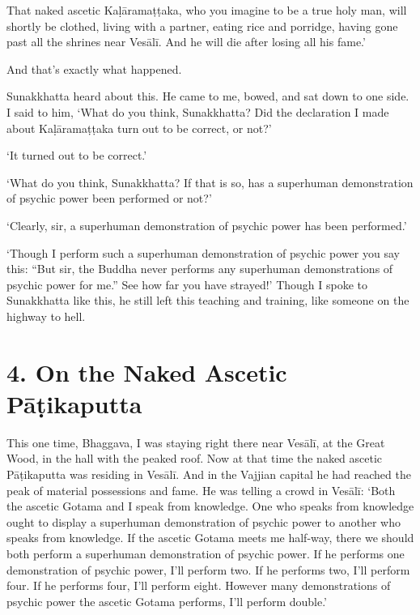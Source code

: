 \documentclass[12pt,openany]{book}%
\begin{document}
That naked ascetic \textsanskrit{Kaḷāramaṭṭaka}, who you imagine to be a true holy man, will shortly be clothed, living with a partner, eating rice and porridge, having gone past all the shrines near \textsanskrit{Vesālī}. And he will die after losing all his fame.’ 

And that’s exactly what happened. 

Sunakkhatta heard about this. He came to me, bowed, and sat down to one side. I said to him, ‘What do you think, Sunakkhatta? Did the declaration I made about \textsanskrit{Kaḷāramaṭṭaka} turn out to be correct, or not?’ 

‘It turned out to be correct.’ 

‘What do you think, Sunakkhatta? If that is so, has a superhuman demonstration of psychic power been performed or not?’ 

‘Clearly, sir, a superhuman demonstration of psychic power has been performed.’ 

‘Though I perform such a superhuman demonstration of psychic power you say this: “But sir, the Buddha never performs any superhuman demonstrations of psychic power for me.” See how far you have strayed!’ Though I spoke to Sunakkhatta like this, he still left this teaching and training, like someone on the highway to hell. 

\section*{4. On the Naked Ascetic \textsanskrit{Pāṭikaputta} }

This one time, Bhaggava, I was staying right there near \textsanskrit{Vesālī}, at the Great Wood, in the hall with the peaked roof. Now at that time the naked ascetic \textsanskrit{Pāṭikaputta} was residing in \textsanskrit{Vesālī}. And in the Vajjian capital he had reached the peak of material possessions and fame. He was telling a crowd in \textsanskrit{Vesālī}: ‘Both the ascetic Gotama and I speak from knowledge. One who speaks from knowledge ought to display a superhuman demonstration of psychic power to another who speaks from knowledge. If the ascetic Gotama meets me half-way, there we should both perform a superhuman demonstration of psychic power. If he performs one demonstration of psychic power, I’ll perform two. If he performs two, I’ll perform four. If he performs four, I’ll perform eight. However many demonstrations of psychic power the ascetic Gotama performs, I’ll perform double.’ 
\end{document}
